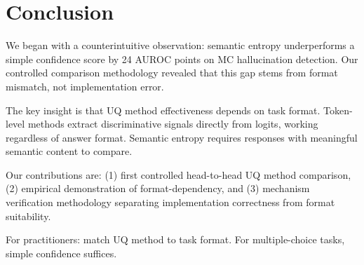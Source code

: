 \section{Conclusion}
\label{sec:conclusion}

We began with a counterintuitive observation: semantic entropy underperforms a simple confidence score by 24 AUROC points on MC hallucination detection. Our controlled comparison methodology revealed that this gap stems from format mismatch, not implementation error.

The key insight is that UQ method effectiveness depends on task format. Token-level methods extract discriminative signals directly from logits, working regardless of answer format. Semantic entropy requires responses with meaningful semantic content to compare.

Our contributions are: (1) first controlled head-to-head UQ method comparison, (2) empirical demonstration of format-dependency, and (3) mechanism verification methodology separating implementation correctness from format suitability.

For practitioners: match UQ method to task format. For multiple-choice tasks, simple confidence suffices.
